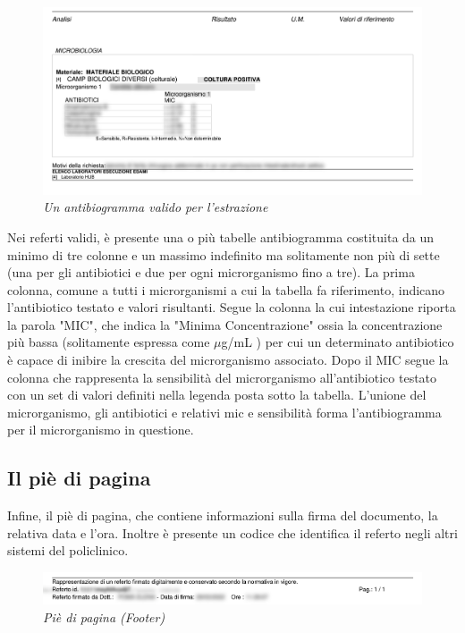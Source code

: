 \begin{figure}[h!]
	\centering
	\includegraphics[width=.99\columnwidth]{images/content.png}
	\caption{\textit{Un antibiogramma valido per l'estrazione}}
	\label{fig:content}
\end{figure}
\bigskip
Nei referti validi, è presente una o più tabelle antibiogramma costituita da un minimo di tre colonne e un massimo indefinito ma solitamente non più di sette (una per gli antibiotici e due per ogni microrganismo fino a tre).
La prima colonna, comune a tutti i microrganismi a cui la tabella fa riferimento, indicano l'antibiotico testato e valori risultanti.
Segue la colonna la cui intestazione riporta la parola "MIC", che indica la "Minima Concentrazione" ossia la concentrazione più bassa (solitamente espressa come $\mu$g/mL ) per cui un determinato antibiotico è capace di inibire la crescita del microrganismo associato.
Dopo il MIC segue la colonna che rappresenta la sensibilità del microrganismo all'antibiotico testato con un set di valori definiti nella legenda posta sotto la tabella.
L'unione del microrganismo, gli antibiotici e relativi mic e sensibilità forma l'antibiogramma per il microrganismo in questione.


\subsection{Il piè di pagina}
Infine, il piè di pagina, che contiene informazioni sulla firma del documento, la relativa data e l'ora. Inoltre è presente un codice  che identifica il referto negli altri sistemi del policlinico.

\begin{figure}[h!]
	\centering
	\includegraphics[width=.99\columnwidth]{images/footer.png}
	\caption{\textit{Piè di pagina (Footer)}}
	\label{fig:footer}
\end{figure}
\bigskip
\newpage


